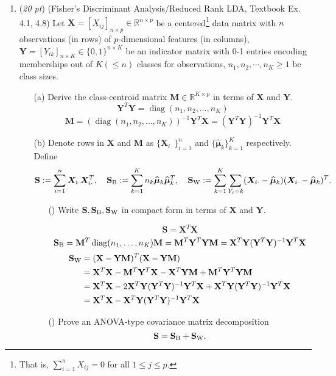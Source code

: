 \documentclass[10pt]{article}
\theoremstyle{definition}
\theoremstyle{remark}
\newcommand{\Mb}{\mathbf{M}}
\newcommand{\Sbb}{\mathbf{S}}
\newcommand{\Xb}{\mathbf{X}}
\newcommand{\Yb}{\mathbf{Y}}
\newcommand{\bX}{\bm{X}}
\newcommand{\bmu}{\bm{\mu}}
\newcommand{\bbR}{\mathbb{R}}
\DeclareMathOperator{\diag}{diag}
\begin{document}
\begin{enumerate}
	\item (\textit{20 pt}) (Fisher's Discriminant Analysis/Reduced Rank LDA, Textbook Ex. 4.1, 4.8) Let $ \Xb = [X_{ij}]_{n\times p} \in \bbR^{n\times p} $ be a centered\footnote{That is, $ \sum_{i=1}^{n}X_{ij} = 0 $ for all $ 1 \le j \le p $.} data matrix with $ n $ observations (in rows) of $ p $-dimensional features (in columns), $ \Yb = [Y_{ik}]_{n\times K} \in \{0,1\}^{n\times K} $ be an indicator matrix with 0-1 entries encoding memberships out of $ K(\le n) $ classes for observations, $ n_{1},n_{2},\cdots,n_{K} \ge 1 $ be class sizes.
	\begin{itemize}
		\item [(a)] Derive the class-centroid matrix $ \Mb \in \bbR^{K \times p} $ in terms of $ \Xb $ and $ \Yb $.
		\[
		\Yb^T\Yb = \diag(n_1, n_2, \hdots, n_K)
		\]
		\[
		\Mb = ( \diag(n_1, n_2, \hdots, n_K) )^{-1} \Yb^T\Xb = ( \Yb^T\Yb )^{-1} \Yb^T\Xb
		\]
		
		\item [(b)] Denote rows in $ \Xb $ and $ \Mb $ as $ \{ \bX_{i\cdot} \}_{i=1}^{n} $ and $ \{ \widehat{\bmu}_{k} \}_{k=1}^{K} $ respectively. Define
		\[ \Sbb := \sum_{i=1}^{n}\bX_{i\cdot}\bX_{i\cdot}^{T}, \quad \Sbb_{\rm B} := \sum_{k=1}^{K}n_{k}\widehat{\bmu}_{k}\widehat{\bmu}_{k}^{T}, \quad \Sbb_{\rm W} := \sum_{k=1}^{K}\sum_{Y_{i} = k}(\bX_{i\cdot} - \widehat{\bmu}_{k})(\bX_{i\cdot} - \widehat{\bmu}_{k})^{T}. \]
		\begin{itemize}[leftmargin=*]
			\item [(\romannum{1})] Write $ \Sbb,\Sbb_{\rm B},\Sbb_{\rm W} $ in compact form in terms of $ \Xb $ and $ \Yb $.
			
			\[ \Sbb = \Xb^T\Xb \]
			\[ \Sbb_{\rm B} = \Mb^T \diag(n_1, \hdots, n_K) \Mb = \Mb^T \Yb^T\Yb \Mb = \Xb^T\Yb ( \Yb^T\Yb )^{-1} \Yb^T\Xb \]
			\begin{align*}
			    \Sbb_{\rm W} & = (\Xb - \Yb\Mb)^T(\Xb - \Yb\Mb) \\
			    & = \Xb^T\Xb -\Mb^T\Yb^T\Xb - \Xb^T\Yb\Mb + \Mb^T\Yb^T\Yb\Mb \\
			    & = \Xb^T\Xb -2\Xb^T\Yb(\Yb^T\Yb)^{-1}\Yb^T\Xb + \Xb^T\Yb ( \Yb^T\Yb )^{-1} \Yb^T\Xb \\
			    & = \Xb^T\Xb -\Xb^T\Yb(\Yb^T\Yb)^{-1}\Yb^T\Xb
			\end{align*}
			
			\item [(\romannum{2})] Prove an ANOVA-type covariance matrix decomposition
			\[ \Sbb = \Sbb_{\rm B} + \Sbb_{\rm W}. \]
			

\end{itemize}
\end{itemize}
\end{enumerate}
\end{document}
